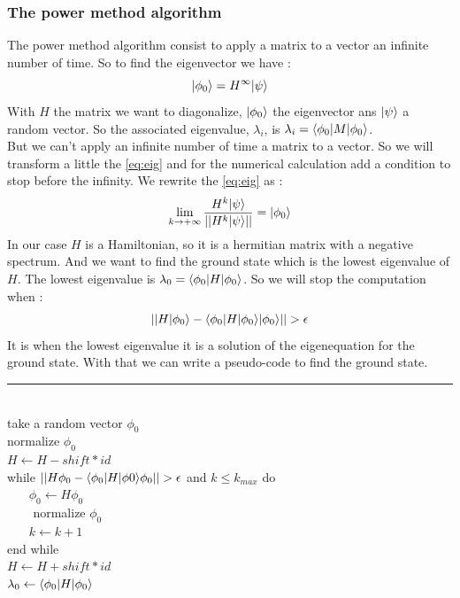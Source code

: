 \documentclass[1pt, a4paper]{article}
\begin{document}
\subsubsection{The power method algorithm}
\label{subs:pow}
\noindent
The power method algorithm consist to apply a matrix to a vector an infinite number of time. So to find the eigenvector we have :
\begin{equation}
\label{eq:eig}
    \ket{\phi_0} = H^{\infty}\ket{\psi}
\end{equation}
With $H$ the matrix we want to diagonalize, $\ket{\phi_0}$ the eigenvector ans $\ket{\psi}$ a random vector. So the associated eigenvalue, $\lambda_i$, is $\lambda_i = \Braket{\phi_0}{M}{\phi_0}$.\\
But we can't apply an infinite number of time a matrix to a vector. So we will transform a little the \autoref{eq:eig} and for the numerical calculation add a condition to stop before the infinity. We rewrite the \autoref{eq:eig} as :
\begin{equation}
    \lim_{k\rightarrow +\infty} \dfrac{H^k\ket{\psi}}{||H^k\ket{\psi}||} = \ket{\phi_0}
\end{equation}
In our case $H$ is a Hamiltonian, so it is a hermitian matrix with a negative spectrum. And we want to find the ground state which is the lowest eigenvalue of $H$. The lowest eigenvalue is $\lambda_0 = \Braket{\phi_0}{H}{\phi_0}$. So we will stop the computation when :
\begin{equation}
    ||H\ket{\phi_0} - \Braket{\phi_0}{H}{\phi_0}\ket{\phi_0}|| > \epsilon
\end{equation}
It is when the lowest eigenvalue it is a solution of the eigenequation for the ground state. With that we can write a pseudo-code to find the ground state.\\
\hrule
\noindent
\\
take a random vector $\phi_0$\\
normalize $\phi_0$\\
$H \leftarrow H - shift * id$\\
while $||H\phi_0 - \Braket{\phi_0}{H}{\phi 0}\phi_0|| > \epsilon$ and $k\leq k_{max}$ do\\
$~~~~~~~~\phi_0 \leftarrow H\phi_0$\\
$~~~~~~~~$ normalize $\phi_0$\\
$~~~~~~~~ k \leftarrow k + 1$\\
end while\\
$H \leftarrow H + shift * id$\\
$\lambda_0 \leftarrow \Braket{\phi_0}{H}{\phi_0}$\\
\end{document}
